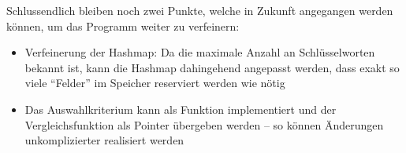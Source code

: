 Schlussendlich bleiben noch zwei Punkte, welche in Zukunft angegangen werden können, um das Programm weiter zu verfeinern:

\begin{itemize}
    \item Verfeinerung der Hashmap: Da die maximale Anzahl an Schlüsselworten bekannt ist, kann die Hashmap dahingehend angepasst werden, dass exakt so viele "`Felder"' im Speicher reserviert werden wie nötig
    \item Das Auswahlkriterium kann als Funktion implementiert und der Vergleichsfunktion als Pointer übergeben werden -- so können Änderungen unkomplizierter realisiert werden
\end{itemize}




